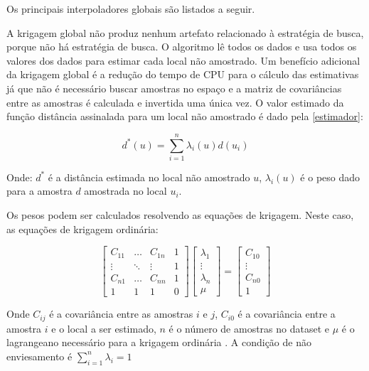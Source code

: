 Os principais interpoladores globais são listados a seguir.


A krigagem global \cite{neufeldglobalkriging} não produz nenhum artefato relacionado à estratégia de busca, porque não há estratégia de busca. O algoritmo lê todos os dados e usa todos os valores dos dados para estimar cada local não amostrado. Um benefício adicional da krigagem global é a redução do tempo de CPU para o cálculo das estimativas já que não é necessário buscar amostras no espaço e a matriz de covariâncias entre as amostras é calculada e invertida uma única vez. O valor estimado da função distância assinalada para um local não amostrado é dado pela \autoref{estimador}:

\begin{equation}
\label{estimador}
d^*(u)=\sum_{i=1}^{n} \lambda_i(u) d(u_i)
\end{equation}

Onde: $d^*$ é a distância estimada no local não amostrado $u$, $\lambda_i(u)$ é o peso dado para a amostra $d$ amostrada no local $u_i$.

Os pesos podem ser calculados resolvendo as equações de krigagem. Neste caso, as equações de krigagem ordinária:

\begin{equation}
    \label{global_k}
    \begin{bmatrix} 
    C_{11}&\dots&C_{1n}&1\\
    \vdots&\ddots&\vdots&1\\
    C_{n1}&\dots&C_{nn}&1\\ 
    1&1&1&0
    \end{bmatrix}
    \begin{bmatrix} 
    \lambda_{1}\\
    \vdots\\
    \lambda_{n}\\ 
    \mu
    \end{bmatrix}
    =
    \begin{bmatrix} 
    C_{10}\\
    \vdots\\
    C_{n0}\\ 
    1
    \end{bmatrix}
\end{equation}

Onde $C_{ij}$ é a covariância entre as amostras $i$ e $j$, $C_{i0}$ é a covariância entre a amostra $i$ e o local a ser estimado, $n$ é o número de amostras no dataset e $\mu$ é o lagrangeano necessário para a krigagem ordinária \cite{isaaks1989applied}. A condição de não enviesamento é $\sum_{i=1}^{n} \lambda_i=1$

